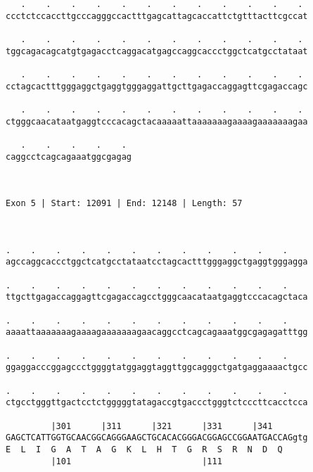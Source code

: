 \documentclass{article}
\begin{document}
\begin{Verbatim}
   .    .    .    .    .    .    .    .    .    .    .    . 
ccctctccaccttgcccagggccactttgagcattagcaccattctgtttacttcgccat
                                                            
   .    .    .    .    .    .    .    .    .    .    .    . 
tggcagacagcatgtgagacctcaggacatgagccaggcaccctggctcatgcctataat
                                                            
   .    .    .    .    .    .    .    .    .    .    .    . 
cctagcactttgggaggctgaggtgggaggattgcttgagaccaggagttcgagaccagc
                                                            
   .    .    .    .    .    .    .    .    .    .    .    . 
ctgggcaacataatgaggtcccacagctacaaaaattaaaaaaagaaaagaaaaaaagaa
                                                            
   .    .    .    .    . 
caggcctcagcagaaatggcgagag
                         
                         
 
Exon 5 | Start: 12091 | End: 12148 | Length: 57



.    .    .    .    .    .    .    .    .    .    .    .    
agccaggcaccctggctcatgcctataatcctagcactttgggaggctgaggtgggagga
                                                            
.    .    .    .    .    .    .    .    .    .    .    .    
ttgcttgagaccaggagttcgagaccagcctgggcaacataatgaggtcccacagctaca
                                                            
.    .    .    .    .    .    .    .    .    .    .    .    
aaaattaaaaaaagaaaagaaaaaaagaacaggcctcagcagaaatggcgagagatttgg
                                                            
.    .    .    .    .    .    .    .    .    .    .    .    
ggaggacccggagccctggggtatggaggtaggttggcagggctgatgaggaaaactgcc
                                                            
.    .    .    .    .    .    .    .    .    .    .    .    
ctgcctgggttgactcctctgggggtatagaccgtgaccctgggtctcccttcacctcca
                                                            
         |301      |311      |321      |331      |341       
GAGCTCATTGGTGCAACGGCAGGGAAGCTGCACACGGGACGGAGCCGGAATGACCAGgtg
E  L  I  G  A  T  A  G  K  L  H  T  G  R  S  R  N  D  Q     
         |101                          |111                 
  

\end{Verbatim}
\end{document}
